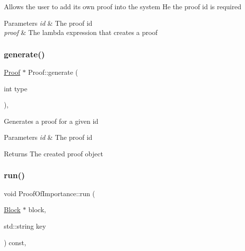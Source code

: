Allows the user to add its own proof into the system He the proof id is required


\begin{DoxyParams}{Parameters}
{\em id} & The proof id \\
\hline
{\em proof} & The lambda expression that creates a proof \\
\hline
\end{DoxyParams}
\mbox{\label{classProof_a267f0f4587babb59884b5f280e2d54c8}} 
\subsubsection{\texorpdfstring{generate()}{generate()}}
{\footnotesize\ttfamily \mbox{\hyperlink{classProof}{Proof}} $\ast$ Proof\+::generate (\begin{DoxyParamCaption}\item[{int}]{type }\end{DoxyParamCaption})\hspace{0.3cm}{\ttfamily [static]}, {\ttfamily [inherited]}}

Generates a proof for a given id


\begin{DoxyParams}{Parameters}
{\em id} & The proof id \\
\hline
\end{DoxyParams}
\begin{DoxyReturn}{Returns}
The created proof object 
\end{DoxyReturn}
\mbox{\label{classProofOfImportance_a08f72d852cefc73c21bc22cbdaf956ff}} 
\subsubsection{\texorpdfstring{run()}{run()}}
{\footnotesize\ttfamily void Proof\+Of\+Importance\+::run (\begin{DoxyParamCaption}\item[{\mbox{\hyperlink{classBlock}{Block}} $\ast$}]{block,  }\item[{std\+::string}]{key }\end{DoxyParamCaption}) const\hspace{0.3cm}{\ttfamily [override]}, {\ttfamily [virtual]}}

